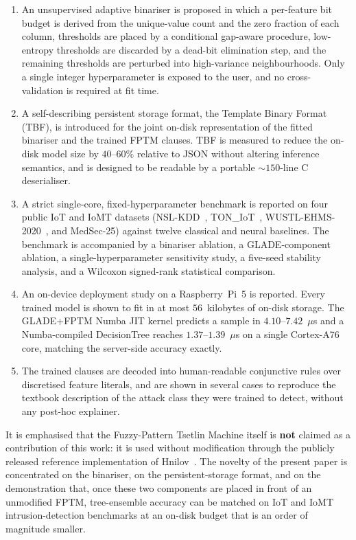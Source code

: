 \documentclass[journal,10pt]{IEEEtran}
\begin{document}
\begin{enumerate}
  \item An unsupervised adaptive binariser is proposed in which a
        per-feature bit budget is derived from the unique-value count
        and the zero fraction of each column, thresholds are placed by
        a conditional gap-aware procedure, low-entropy thresholds are
        discarded by a dead-bit elimination step, and the remaining
        thresholds are perturbed into high-variance neighbourhoods.
        Only a single integer hyperparameter is exposed to the user,
        and no cross-validation is required at fit time.
  \item A self-describing persistent storage format, the Template
        Binary Format (TBF), is introduced for the joint on-disk
        representation of the fitted binariser and the trained FPTM
        clauses. TBF is measured to reduce the on-disk model size by
        $40$--$60\%$ relative to JSON without altering inference
        semantics, and is designed to be readable by a portable
        $\sim$$150$-line C deserialiser.
  \item A strict single-core, fixed-hyperparameter benchmark is
        reported on four public IoT and IoMT datasets
        (NSL-KDD~\cite{tavallaee2009nslkdd},
        TON\_IoT~\cite{moustafa2021ton},
        WUSTL-EHMS-2020~\cite{hady2020wustl}, and MedSec-25) against
        twelve classical and neural baselines. The benchmark is
        accompanied by a binariser ablation, a GLADE-component
        ablation, a single-hyperparameter sensitivity study, a
        five-seed stability analysis, and a Wilcoxon signed-rank
        statistical comparison.
  \item An on-device deployment study on a Raspberry~Pi~5 is reported.
        Every trained model is shown to fit in at most $56$~kilobytes
        of on-disk storage. The GLADE+FPTM Numba JIT kernel predicts a
        sample in $4.10$--$7.42$~$\mu$s and a Numba-compiled DecisionTree
        reaches $1.37$--$1.39$~$\mu$s on a single Cortex-A76 core,
        matching the server-side accuracy exactly.
  \item The trained clauses are decoded into human-readable
        conjunctive rules over discretised feature literals, and are
        shown in several cases to reproduce the textbook description of
        the attack class they were trained to detect, without any
        post-hoc explainer.
\end{enumerate}

It is emphasised that the Fuzzy-Pattern Tsetlin Machine itself is
\textbf{not} claimed as a contribution of this work: it is used without
modification through the publicly released reference implementation of
Hnilov~\cite{hnilov2025fuzzy}. The novelty of the present paper is
concentrated on the binariser, on the persistent-storage format, and
on the demonstration that, once these two components are placed in
front of an unmodified FPTM, tree-ensemble accuracy can be matched on
IoT and IoMT intrusion-detection benchmarks at an on-disk budget that
is an order of magnitude smaller.
\end{document}
